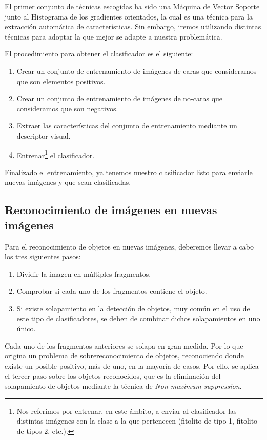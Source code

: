 El primer conjunto de técnicas escogidas ha sido una Máquina de Vector Soporte junto al Histograma de los gradientes orientados, la cual es una técnica para la extracción automática de características. Sin embargo, iremos utilizando distintas técnicas para adoptar la que mejor se adapte a nuestra problemática.

El procedimiento para obtener el clasificador es el siguiente:

\begin{enumerate}[1.]
  \item Crear un conjunto de entrenamiento de imágenes de caras que consideramos que son elementos positivos.
  \item Crear un conjunto de entrenamiento de imágenes de no-caras que consideramos que son negativos.
  \item Extraer las características del conjunto de entrenamiento  mediante un descriptor visual.
  \item Entrenar\footnote{Nos referimos por entrenar, en este ámbito, a enviar al clasificador las distintas imágenes con la clase a la que pertenecen (fitolito de tipo 1, fitolito de tipos 2, etc.).} el clasificador.
\end{enumerate}

 Finalizado el entrenamiento, ya tenemos nuestro clasificador listo para enviarle nuevas imágenes y que sean clasificadas.
 
\subsection{Reconocimiento de imágenes en nuevas imágenes}
Para el reconocimiento de objetos en nuevas imágenes, deberemos llevar a cabo los tres siguientes pasos:

\begin{enumerate}[1.]
  \item Dividir la imagen en múltiples fragmentos.
  \item Comprobar si cada uno de los fragmentos contiene el objeto.
  \item Si existe solapamiento en la detección de objetos, muy común en el uso de este tipo de clasificadores, se deben de combinar dichos solapamientos en uno único.
\end{enumerate}

Cada uno de los fragmentos anteriores se solapa en gran medida. Por lo que origina un problema de sobrereconocimiento de objetos, reconociendo donde existe un posible positivo, más de uno, en la mayoría de casos. Por ello, se aplica el tercer paso sobre los objetos reconocidos, que es la eliminación del solapamiento de objetos mediante la técnica de \textit{Non-maximum suppression}.


